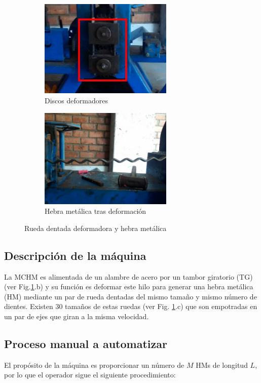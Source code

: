 \documentclass[main_conf.tex]{subfiles}
\begin{document}
\begin{figure}[t]
  \centering
  \begin{subfigure}[b]{0.5\textwidth}
    \centering
    \includegraphics[width=2.5in]{../img/maquina/deformadores.jpg}
    \caption{Discos deformadores}
  \end{subfigure}

  \begin{subfigure}[b]{0.5\textwidth}
    \centering
    \includegraphics[width=2.5in]{../img/maquina/hebra.jpg}
    \caption{Hebra metálica tras deformación}
  \end{subfigure}

  \caption{Rueda dentada deformadora y hebra metálica}
  \label{maquina_a_automatizar}
\end{figure}


\subsection{Descripción de la máquina}
La MCHM es alimentada de un alambre de acero por un tambor
giratorio (TG) (ver Fig.\ref{maquina_a_automatizar}.b) y su función es
deformar este hilo para generar una hebra metálica (HM) mediante un
par de rueda dentadas del mismo tamaño y mismo número de dientes.
Existen 30 tamaños de estas ruedas (ver Fig.
\ref{maquina_a_automatizar}.c) que son empotradas en un par
de ejes que giran a la misma velocidad.

\subsection{Proceso manual a automatizar}
\label{sec:intro:proceso_manual}
El propósito de la máquina es proporcionar un número de $M$ HMs
de longitud $L$, por lo que el operador sigue el siguiente
procedimiento:
\end{document}
